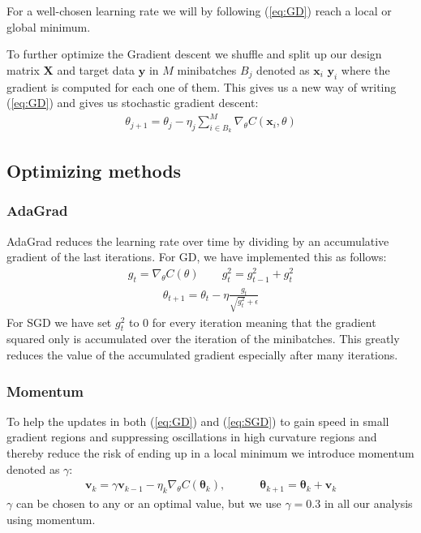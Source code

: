 \documentclass[11pt]{article}
\begin{document}
For a well-chosen learning rate we will by following (\ref{eq:GD}) reach a local or global minimum.

To further optimize the Gradient descent we shuffle and split up our design matrix $\boldsymbol{X}$ and target data $\boldsymbol{y}$ in $M$ minibatches $B_j$ denoted as $\boldsymbol{x}_i$ $\boldsymbol{y}_i$ where the gradient is computed for each one of them. This gives us a new way of writing (\ref{eq:GD}) and gives us stochastic gradient descent:
\begin{align}
    \label{eq:SGD}
    \theta_{j+1} = \theta_j - \eta_j \sum_{i\in B_k}^M \nabla_\theta C(\boldsymbol{x}_i, \theta)
\end{align}

\subsection{Optimizing methods}
\subsubsection*{AdaGrad}
AdaGrad reduces the learning rate over time by dividing by an accumulative gradient of the last iterations. For GD, we have implemented this as follows:
\begin{align*}
    g_t = \nabla_\theta C(\theta) \quad\quad g_t^2 = g_{t-1}^2 + g_t^2
\end{align*}
\begin{align*}
    \theta_{t+1} = \theta_t - \eta \frac{g_t}{\sqrt{g_t^2} + \epsilon}
\end{align*}
For SGD we have set $g_t^2$ to 0 for every iteration meaning that the gradient squared only is accumulated over the iteration of the minibatches. This greatly reduces the value of the accumulated gradient especially after many iterations.
\subsubsection*{Momentum}
To help the updates in both (\ref{eq:GD}) and (\ref{eq:SGD}) to gain speed in small gradient regions and suppressing oscillations in high curvature regions and thereby reduce the risk of ending up in a local minimum we introduce momentum denoted as $\gamma$:
\begin{align}
    \label{eq:GD_mom}
    \boldsymbol{v}_{k} = \gamma\boldsymbol{v}_{k-1} - \eta_k \nabla_\theta C(\boldsymbol{\theta}_k),\quad\quad\quad\boldsymbol{\theta}_{k+1} = \boldsymbol{\theta}_k + \boldsymbol{v}_k
\end{align}
$\gamma$ can be chosen to any or an optimal value, but we use $\gamma=0.3$ in all our analysis using momentum.
\end{document}

